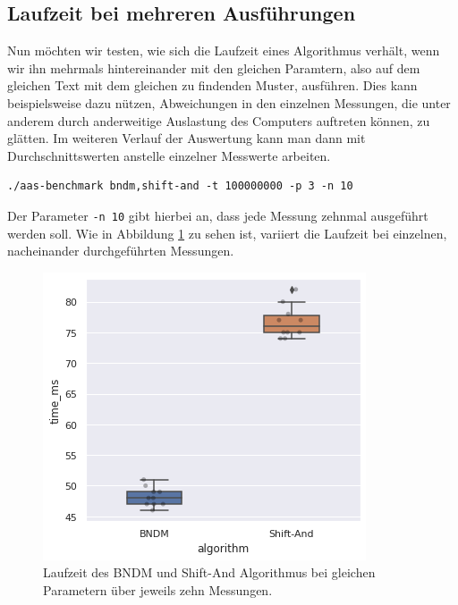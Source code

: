 \documentclass[twocolumn]{article}
\begin{document}
\subsection*{Laufzeit bei mehreren Ausführungen}

Nun möchten wir testen, wie sich die Laufzeit eines Algorithmus verhält, wenn wir ihn mehrmals hintereinander mit den gleichen Paramtern, also auf dem gleichen Text mit dem gleichen zu findenden Muster, ausführen. Dies kann beispielsweise dazu nützen, Abweichungen in den einzelnen Messungen, die unter anderem durch anderweitige Auslastung des Computers auftreten können, zu glätten. Im weiteren Verlauf der Auswertung kann man dann mit Durchschnittswerten anstelle einzelner Messwerte arbeiten.

\begin{lstlisting}[breaklines=true,autogobble=true]
    ./aas-benchmark bndm,shift-and -t 100000000 -p 3 -n 10
\end{lstlisting}

Der Parameter \texttt{-n 10} gibt hierbei an, dass jede Messung zehnmal ausgeführt werden soll. Wie in Abbildung \ref{fig:runtime_bndm_shift_and} zu sehen ist, variiert die Laufzeit bei einzelnen, nacheinander durchgeführten Messungen.

\begin{figure}
    \centering
    \includegraphics[width=0.85\linewidth]{assets/graph_3.png}
    \caption{Laufzeit des BNDM und Shift-And Algorithmus bei gleichen Parametern über jeweils zehn Messungen.}
    \label{fig:runtime_bndm_shift_and}
\end{figure}
\end{document}
